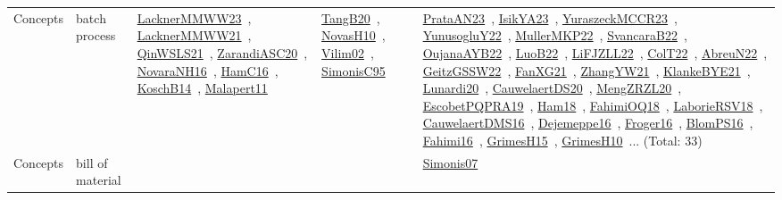 {\begin{longtable}{lp{3cm}>{\raggedright\arraybackslash}p{6cm}>{\raggedright\arraybackslash}p{6cm}>{\raggedright\arraybackslash}p{8cm}}
Concepts & batch process & \href{works/LacknerMMWW23.pdf}{LacknerMMWW23}~\cite{LacknerMMWW23}, \href{works/LacknerMMWW21.pdf}{LacknerMMWW21}~\cite{LacknerMMWW21}, \href{works/QinWSLS21.pdf}{QinWSLS21}~\cite{QinWSLS21}, \href{works/ZarandiASC20.pdf}{ZarandiASC20}~\cite{ZarandiASC20}, \href{works/NovaraNH16.pdf}{NovaraNH16}~\cite{NovaraNH16}, \href{works/HamC16.pdf}{HamC16}~\cite{HamC16}, \href{works/KoschB14.pdf}{KoschB14}~\cite{KoschB14}, \href{works/Malapert11.pdf}{Malapert11}~\cite{Malapert11} & \href{works/TangB20.pdf}{TangB20}~\cite{TangB20}, \href{works/NovasH10.pdf}{NovasH10}~\cite{NovasH10}, \href{works/Vilim02.pdf}{Vilim02}~\cite{Vilim02}, \href{works/SimonisC95.pdf}{SimonisC95}~\cite{SimonisC95} & \href{works/PrataAN23.pdf}{PrataAN23}~\cite{PrataAN23}, \href{works/IsikYA23.pdf}{IsikYA23}~\cite{IsikYA23}, \href{works/YuraszeckMCCR23.pdf}{YuraszeckMCCR23}~\cite{YuraszeckMCCR23}, \href{works/YunusogluY22.pdf}{YunusogluY22}~\cite{YunusogluY22}, \href{works/MullerMKP22.pdf}{MullerMKP22}~\cite{MullerMKP22}, \href{works/SvancaraB22.pdf}{SvancaraB22}~\cite{SvancaraB22}, \href{works/OujanaAYB22.pdf}{OujanaAYB22}~\cite{OujanaAYB22}, \href{works/LuoB22.pdf}{LuoB22}~\cite{LuoB22}, \href{works/LiFJZLL22.pdf}{LiFJZLL22}~\cite{LiFJZLL22}, \href{works/ColT22.pdf}{ColT22}~\cite{ColT22}, \href{works/AbreuN22.pdf}{AbreuN22}~\cite{AbreuN22}, \href{works/GeitzGSSW22.pdf}{GeitzGSSW22}~\cite{GeitzGSSW22}, \href{works/FanXG21.pdf}{FanXG21}~\cite{FanXG21}, \href{works/ZhangYW21.pdf}{ZhangYW21}~\cite{ZhangYW21}, \href{works/KlankeBYE21.pdf}{KlankeBYE21}~\cite{KlankeBYE21}, \href{works/Lunardi20.pdf}{Lunardi20}~\cite{Lunardi20}, \href{works/CauwelaertDS20.pdf}{CauwelaertDS20}~\cite{CauwelaertDS20}, \href{works/MengZRZL20.pdf}{MengZRZL20}~\cite{MengZRZL20}, \href{works/EscobetPQPRA19.pdf}{EscobetPQPRA19}~\cite{EscobetPQPRA19}, \href{works/Ham18.pdf}{Ham18}~\cite{Ham18}, \href{works/FahimiOQ18.pdf}{FahimiOQ18}~\cite{FahimiOQ18}, \href{works/LaborieRSV18.pdf}{LaborieRSV18}~\cite{LaborieRSV18}, \href{works/CauwelaertDMS16.pdf}{CauwelaertDMS16}~\cite{CauwelaertDMS16}, \href{works/Dejemeppe16.pdf}{Dejemeppe16}~\cite{Dejemeppe16}, \href{works/Froger16.pdf}{Froger16}~\cite{Froger16}, \href{works/BlomPS16.pdf}{BlomPS16}~\cite{BlomPS16}, \href{works/Fahimi16.pdf}{Fahimi16}~\cite{Fahimi16}, \href{works/GrimesH15.pdf}{GrimesH15}~\cite{GrimesH15}, \href{works/GrimesH10.pdf}{GrimesH10}~\cite{GrimesH10}... (Total: 33)\\
Concepts & bill of material &  &  & \href{works/Simonis07.pdf}{Simonis07}~\cite{Simonis07}\\

\end{longtable}}
